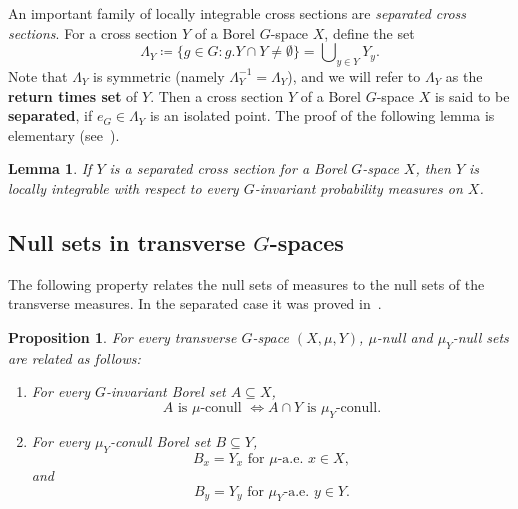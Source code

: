 \documentclass{amsart}
\numberwithin{equation}{subsection}
\newtheorem{lem}[thm]{Lemma}
\newtheorem{prop}[thm]{Proposition}
\theoremstyle{remark}
\begin{document}
An important family of locally integrable cross sections are \emph{separated cross sections}. For a cross section \(Y\) of a Borel \(G\)-space \(X\), define the set
\[\Lambda_{Y}\coloneqq \{g\in G:g.Y\cap Y\neq\emptyset\}=\bigcup\nolimits_{y\in Y}Y_{y}.\]
Note that \(\Lambda_{Y}\) is symmetric (namely \(\Lambda_{Y}^{-1}=\Lambda_{Y}\)), and we will refer to \(\Lambda_{Y}\) as the {\bf return times set} of \(Y\). Then a cross section \(Y\) of a Borel \(G\)-space \(X\) is said to be {\bf separated}, if \(e_{G}\in\Lambda_{Y}\) is an isolated point. The proof of the following lemma is elementary (see~\cite[Lemma 3.1(ii)]{bjorklund2025int}).

\begin{lem}\label{lem:separatedli}
If \(Y\) is a separated cross section for a Borel \(G\)-space \(X\), then \(Y\) is locally integrable with respect to every \(G\)-invariant probability measures on \(X\).
\end{lem}

\subsection{Null sets in transverse \(G\)-spaces}

The following property relates the null sets of measures to the null sets of the transverse measures. In the separated case it was proved in~\cite[Lemma 4.6]{bjorklund2025int}.

\begin{prop}\label{prop:null}
For every transverse \(G\)-space \(\left(X,\mu,Y\right)\), \(\mu\)-null and \(\mu_{Y}\)-null sets are related as follows:
\begin{enumerate}
    \item For every \(G\)-invariant Borel set \(A\subseteq X\),
    \[A\text{ is }\mu\text{-conull }\iff A\cap Y\text{ is }\mu_{Y}\text{-conull}.\]
    \item For every \(\mu_{Y}\)-conull Borel set \(B\subseteq Y\),
    \[B_{x}=Y_{x}\text{ for }\mu\text{-a.e. }x\in X,\]
    and
    \[B_{y}=Y_{y}\text{ for }\mu_{Y}\text{-a.e. }y\in Y.\]
\end{enumerate}
\end{prop}
\end{document}
